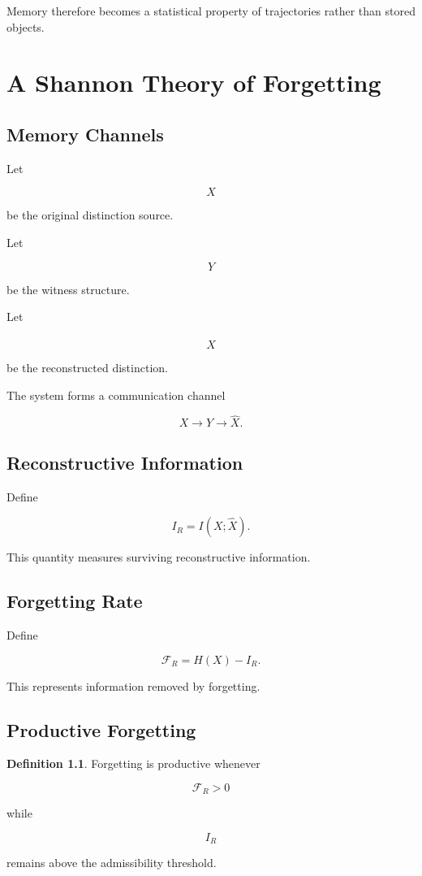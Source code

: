 \documentclass[12pt,oneside]{book}
\theoremstyle{plain} \newtheorem{theorem}{Theorem}[chapter] \newtheorem{lemma}[theorem]{Lemma} \newtheorem{proposition}[theorem]{Proposition} \newtheorem{corollary}[theorem]{Corollary}
\theoremstyle{definition} \newtheorem{definition}[theorem]{Definition} \newtheorem{axiom}[theorem]{Axiom} \newtheorem{construction}[theorem]{Construction}
\theoremstyle{remark} \newtheorem{remark}[theorem]{Remark} \newtheorem{example}[theorem]{Example}
\begin{document}
Memory therefore becomes a statistical property of trajectories rather than stored objects.

\chapter{A Shannon Theory of Forgetting}

\section{Memory Channels}

Let

\[
X
\]

be the original distinction source.

Let

\[
Y
\]

be the witness structure.

Let

\[
\hat X
\]

be the reconstructed distinction.

The system forms a communication channel

\[
X
\rightarrow
Y
\rightarrow
\hat X.
\]

\section{Reconstructive Information}

Define

\[
I_R
=
I(X;\hat X).
\]

This quantity measures surviving reconstructive information.

\section{Forgetting Rate}

Define

\[
\mathcal F_R
=
H(X)-I_R.
\]

This represents information removed by forgetting.

\section{Productive Forgetting}

\begin{definition}

Forgetting is productive whenever

\[
\mathcal F_R>0
\]

while

\[
I_R
\]

remains above the admissibility threshold.

\end{definition}
\end{document}
